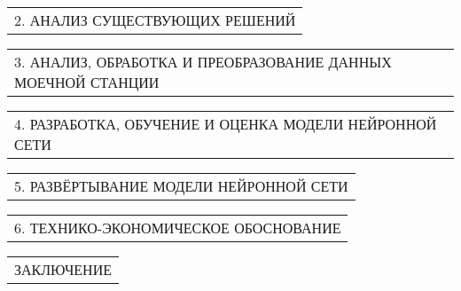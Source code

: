 \documentclass[12pt, А4, twoside]{article}
\begin{document}
\begin{FlushLeft}
		\vspace{-0.1 cm}
		
		\begin{tabular}{p{17.25cm}}
			\hspace{0.3cm} \textsf{2. АНАЛИЗ СУЩЕСТВУЮЩИХ РЕШЕНИЙ} \vspace{0pt} \hline \\
		\end{tabular}
		
		\vspace{-0.1 cm}
		
		\begin{tabular}{p{17.25cm}}
			\hspace{0.3cm} \textsf{3. АНАЛИЗ, ОБРАБОТКА И ПРЕОБРАЗОВАНИЕ ДАННЫХ МОЕЧНОЙ СТАНЦИИ} \vspace{0pt} \hline \\
		\end{tabular}
		
		\vspace{-0.1 cm}
		
		\begin{tabular}{p{17.25cm}}
			\hspace{0.3cm} \textsf{4. РАЗРАБОТКА, ОБУЧЕНИЕ И ОЦЕНКА МОДЕЛИ НЕЙРОННОЙ СЕТИ} \vspace{0pt} \hline \\
		\end{tabular}
		
		\vspace{-0.1 cm}
		
		\begin{tabular}{p{17.25cm}}
			\hspace{0.3cm} \textsf{5. РАЗВЁРТЫВАНИЕ МОДЕЛИ НЕЙРОННОЙ СЕТИ} \vspace{0pt} \hline \\
		\end{tabular}
		
		\vspace{-0.1 cm}
		
		\begin{tabular}{p{17.25cm}}
			\hspace{0.3cm} \textsf{6. ТЕХНИКО-ЭКОНОМИЧЕСКОЕ ОБОСНОВАНИЕ} \vspace{0pt} \hline \\
		\end{tabular}
		
		\vspace{-0.1 cm}
		
		\begin{tabular}{p{17.25cm}} 
			\hspace{0.3cm} \textsf{ЗАКЛЮЧЕНИЕ} \vspace{0pt} \hline \\
		\end{tabular}  
		

\end{FlushLeft}
\end{document}
